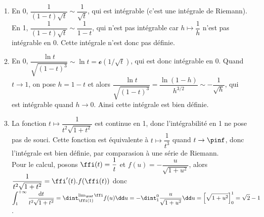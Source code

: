 \begin{enumerate}
\item En 0, $\dfrac{1}{(1-t)\sqrt t}\sim\dfrac{1}{\sqrt t}$, qui est intégrable (c'est une intégrale de Riemann). En 1, $\dfrac{1}{(1-t)\sqrt t}\sim\dfrac{1}{1-t}$, qui n'est pas intégrable car $h\mapsto\dfrac1h$ n'est pas intégrable en 0. Cette intégrale n'est donc pas définie.
\item  En 0, $\dfrac{\ln t}{\sqrt{(1-t)^3}}\sim\ln t=\mathcal o(1/\sqrt t)$, qui est donc intégrable en 0. Quand $t\to1$, on pose $h=1-t$ et alors $\dfrac{\ln t}{\sqrt{(1-t)^3}}=\dfrac{\ln(1-h)}{h^{3/2}}\sim -\dfrac{1}{\sqrt h}$, qui est intégrable quand $h\to 0$. Ainsi cette intégrale est bien définie.
\item  La fonction $t\mapsto \dfrac{1}{t^2\sqrt{1+t^2}}$ est continue en 1, donc l'intégrabilité en 1 ne pose pas de souci. Cette fonction est équivalente à $t\mapsto\dfrac{1}{t^3}$ quand $t\to\pinf$, donc l'intégrale est bien définie, par comparasion à une série de Riemann.\\
Pour le calcul, posons $\ffi(t)=\dfrac1t$ et $f(u)=-\dfrac{u}{\sqrt{1+u^2}}$, alors $\dfrac{1}{t^2\sqrt{1+t^2}}=\ffi'(t).f(\ffi(t))$ donc $\displaystyle\int_1^{+\infty}\dfrac{\mathrm{d}t}{t^2\sqrt{1+t^2}}=\dint_{\ffi(1)}^{\lim_{\pinf}\ffi}f(u)\dd u=-\dint_1^0\dfrac{u}{\sqrt{1+u^2}}\dd u=\left[\sqrt{1+u^2}\right]_0^1=\sqrt 2-1$.
\end{enumerate}
